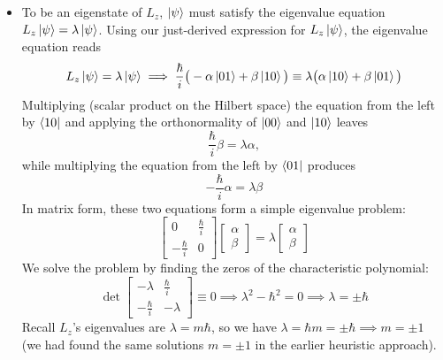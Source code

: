 \documentclass[11pt, a4paper]{article}
\begin{document}
\begin{itemize}
	\item To be an eigenstate of $ L_{z} $, $ \ket{\psi} $ must satisfy the eigenvalue equation $ L_{z}\ket{\psi} = \lambda \ket{\psi}  $. Using our just-derived expression for $ L_{z}\ket{\psi}  $, the eigenvalue equation reads
	\begin{equation*}
		L_{z}\ket{\psi} = \lambda \ket{\psi} \implies \frac{\hbar}{i}\big(-\alpha \ket{01} + \beta \ket{10}\big) \equiv \lambda \big(\alpha \ket{10} + \beta \ket{01}\big)
	\end{equation*}
	Multiplying (scalar product on the Hilbert space) the equation from the left by $ \bra{10} $ and applying the orthonormality of $ \ket{00} $ and $ \ket{10} $ leaves
	\begin{equation*}
		\frac{\hbar}{i}\beta = \lambda \alpha,
	\end{equation*}
	while multiplying the equation from the left by $ \bra{01} $ produces
	\begin{equation*}
		-\frac{\hbar}{i}\alpha = \lambda \beta
	\end{equation*}
	In matrix form, these two equations form a simple eigenvalue problem:
	\begin{equation*}
		\begin{bmatrix}
			0 & \frac{\hbar}{i}\\
			-\frac{\hbar}{i} & 0
		\end{bmatrix}
		\begin{bmatrix}
			\alpha\\
			\beta
		\end{bmatrix}
		= \lambda
		\begin{bmatrix}
			\alpha\\
			\beta
		\end{bmatrix}
	\end{equation*}
	We solve the problem by finding the zeros of the characteristic polynomial:
	\begin{equation*}
		\det 
		\begin{bmatrix}
			-\lambda & \frac{\hbar}{i}\\
			-\frac{\hbar}{i} & -\lambda
		\end{bmatrix} \equiv 0 \implies \lambda^{2} - \hbar^{2} = 0 \implies \lambda = \pm \hbar
	\end{equation*}
	Recall $ L_{z} $'s eigenvalues are $ \lambda = m \hbar $, so we have  $ \lambda = \hbar m = \pm \hbar \implies m = \pm 1$ (we had found the same solutions $ m = \pm 1 $ in the earlier heuristic approach). 
	

\end{itemize}
\end{document}
